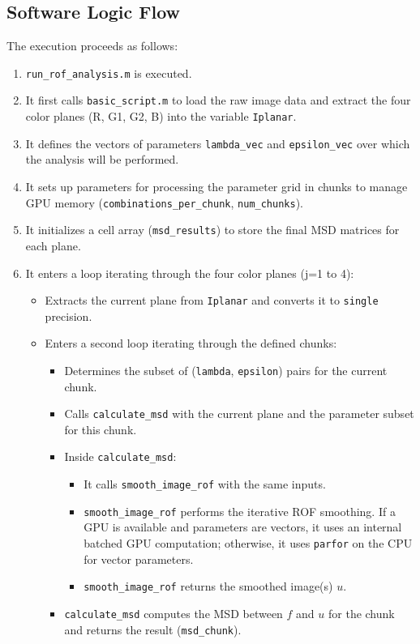 \documentclass{article}
\begin{document}
	\subsection{Software Logic Flow}
	The execution proceeds as follows:
	\begin{enumerate}
		\item \texttt{run\_rof\_analysis.m} is executed.
		\item It first calls \texttt{basic\_script.m} to load the raw image data and extract the four color planes (R, G1, G2, B) into the variable \texttt{Iplanar}.
		\item It defines the vectors of parameters \texttt{lambda\_vec} and \texttt{epsilon\_vec} over which the analysis will be performed.
		\item It sets up parameters for processing the parameter grid in chunks to manage GPU memory (\texttt{combinations\_per\_chunk}, \texttt{num\_chunks}).
		\item It initializes a cell array (\texttt{msd\_results}) to store the final MSD matrices for each plane.
		\item It enters a loop iterating through the four color planes (j=1 to 4):
		\begin{itemize}
			\item Extracts the current plane from \texttt{Iplanar} and converts it to \texttt{single} precision.
			\item Enters a second loop iterating through the defined chunks:
			\begin{itemize}
				\item Determines the subset of (\texttt{lambda}, \texttt{epsilon}) pairs for the current chunk.
				\item Calls \texttt{calculate\_msd} with the current plane and the parameter subset for this chunk.
				\item Inside \texttt{calculate\_msd}:
				\begin{itemize}
					\item It calls \texttt{smooth\_image\_rof} with the same inputs.
					\item \texttt{smooth\_image\_rof} performs the iterative ROF smoothing. If a GPU is available and parameters are vectors, it uses an internal batched GPU computation; otherwise, it uses \texttt{parfor} on the CPU for vector parameters.
					\item \texttt{smooth\_image\_rof} returns the smoothed image(s) $u$.
				\end{itemize}
				\item \texttt{calculate\_msd} computes the MSD between $f$ and $u$ for the chunk and returns the result (\texttt{msd\_chunk}).

\end{itemize}
\end{itemize}
\end{enumerate}
\end{document}
